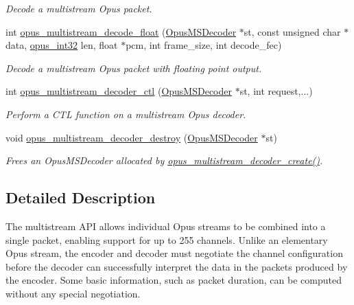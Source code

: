 \begin{DoxyCompactItemize}
\begin{DoxyCompactList}\small\item\em Decode a multistream Opus packet. \item\end{DoxyCompactList}\item 
int \hyperlink{group__opus__multistream_ga620e67c67872f8ea0b67a200c729630a}{opus\_\-multistream\_\-decode\_\-float} (\hyperlink{group__opus__multistream_gad3497495deb9a8ace82e76cd4f93e0e4}{OpusMSDecoder} $\ast$st, const unsigned char $\ast$data, \hyperlink{opus__types_8h_aa4d309d6f80b99dbabebc8f98879ab9a}{opus\_\-int32} len, float $\ast$pcm, int frame\_\-size, int decode\_\-fec)
\begin{DoxyCompactList}\small\item\em Decode a multistream Opus packet with floating point output. \item\end{DoxyCompactList}\item 
int \hyperlink{group__opus__multistream_ga4b3dca8d46e5868cc133f3f6d2b57688}{opus\_\-multistream\_\-decoder\_\-ctl} (\hyperlink{group__opus__multistream_gad3497495deb9a8ace82e76cd4f93e0e4}{OpusMSDecoder} $\ast$st, int request,...)
\begin{DoxyCompactList}\small\item\em Perform a CTL function on a multistream Opus decoder. \item\end{DoxyCompactList}\item 
void \hyperlink{group__opus__multistream_gaaec72b484eabc78d7869221c6d2ce080}{opus\_\-multistream\_\-decoder\_\-destroy} (\hyperlink{group__opus__multistream_gad3497495deb9a8ace82e76cd4f93e0e4}{OpusMSDecoder} $\ast$st)
\begin{DoxyCompactList}\small\item\em Frees an {\ttfamily OpusMSDecoder} allocated by \hyperlink{group__opus__multistream_ga3c0e342774174c471e61cedba53755c9}{opus\_\-multistream\_\-decoder\_\-create()}. \item\end{DoxyCompactList}\end{DoxyCompactItemize}


\subsection{Detailed Description}
The multistream API allows individual Opus streams to be combined into a single packet, enabling support for up to 255 channels. Unlike an elementary Opus stream, the encoder and decoder must negotiate the channel configuration before the decoder can successfully interpret the data in the packets produced by the encoder. Some basic information, such as packet duration, can be computed without any special negotiation.

